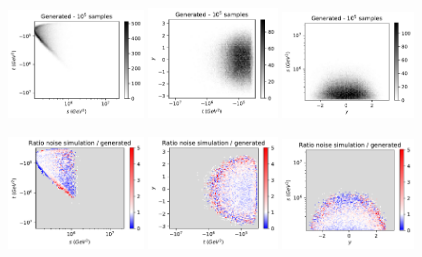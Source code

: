 \documentclass[twocolumn,preprintnumbers,superscriptaddress]{revtex4-2}
\begin{document}
\begin{figure}
  \includegraphics[width=0.32\textwidth]{plots/hardware_noise_simulation/s-t_FAKE_100k_noise-simu.pdf}%
  \includegraphics[width=0.305\textwidth]{plots/hardware_noise_simulation/t-y_FAKE_100k_noise-simu.pdf}%
  \includegraphics[width=0.31\textwidth]{plots/hardware_noise_simulation/y-s_FAKE_100k_noise-simu.pdf}

  \includegraphics[width=0.32\textwidth]{plots/hardware_noise_simulation/s-t_RATIO_100k_noise-generated.pdf}%
  \includegraphics[width=0.305\textwidth]{plots/hardware_noise_simulation/t-y_RATIO_100k_noise-generated.pdf}%
  \includegraphics[width=0.31\textwidth]{plots/hardware_noise_simulation/y-s_RATIO_100k_noise-generated.pdf}



\end{figure}
\end{document}
